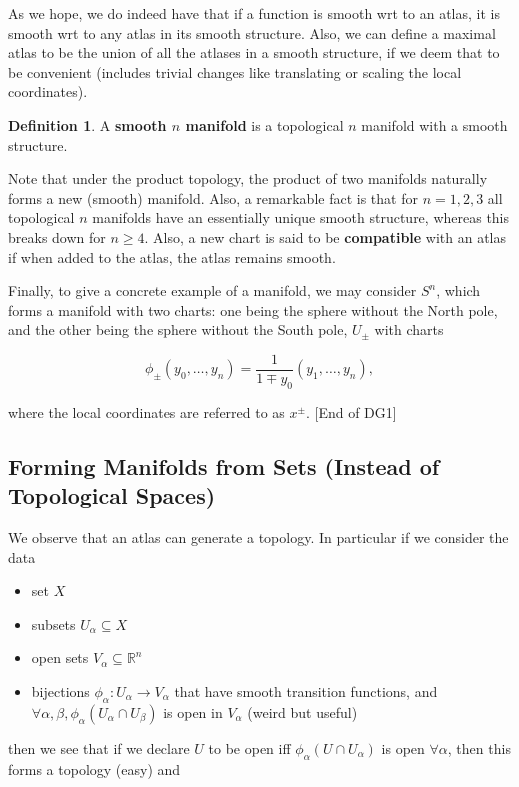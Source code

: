 \documentclass{article}
\theoremstyle{definition}
\newtheorem{definition}{Definition}
\begin{document}
As we hope, we do indeed have that if a function is smooth wrt to an atlas, it
is smooth wrt to any atlas in its smooth structure. Also, we can define a
maximal atlas to be the union of all the atlases in a smooth structure, if we
deem that to be convenient (includes trivial changes like translating or scaling
the local coordinates).

\begin{definition}
  A \textbf{smooth $n$ manifold} is a topological $n$ manifold with a smooth
  structure.
\end{definition}

Note that under the product topology, the product of two manifolds naturally
forms a new (smooth) manifold. Also, a remarkable fact is that for $n=1, 2, 3$
all topological $n$ manifolds have an essentially unique smooth structure,
whereas this breaks down for $n \geq 4$. Also, a new chart is said to be
\textbf{compatible} with an atlas if when added to the atlas, the atlas remains
smooth.

Finally, to give a concrete example of a manifold, we may consider $S^n$, which
forms a manifold with two charts: one being the sphere without the North pole,
and the other being the sphere without the South pole, $U_\pm$ with charts

$$ \phi_\pm(y_0, \dots, y_n) = \frac{1}{1 \mp y_0} (y_1, \dots, y_n), $$

where the local coordinates are referred to as $x^\pm$. [End of DG1]

\subsection{Forming Manifolds from Sets (Instead of Topological Spaces)}

We observe that an atlas can generate a topology. In particular if we consider
the data

\begin{itemize}
\item set $X$
\item subsets $U_\alpha \subseteq X$
\item open sets $V_\alpha \subseteq \mathbb{R}^n$
\item bijections $\phi_\alpha : U_\alpha \to V_\alpha$ that have smooth
  transition functions, and $\forall \alpha, \beta, \phi_\alpha(U_\alpha \cap
  U_\beta)$ is open in $V_\alpha$ (weird but useful)
\end{itemize}

then we see that if we declare $U$ to be open iff $\phi_\alpha(U \cap U_\alpha)$
is open $\forall \alpha$, then this forms a topology (easy) and 
\end{document}
